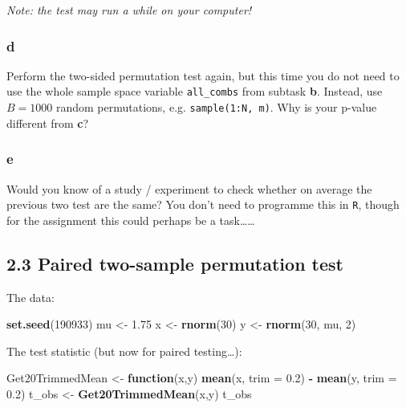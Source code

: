 \documentclass[]{article}
\newenvironment{Shaded}{\begin{snugshade}}{\end{snugshade}}
\newcommand{\ControlFlowTok}[1]{\textcolor[rgb]{0.13,0.29,0.53}{\textbf{#1}}}
\newcommand{\DataTypeTok}[1]{\textcolor[rgb]{0.13,0.29,0.53}{#1}}
\newcommand{\DecValTok}[1]{\textcolor[rgb]{0.00,0.00,0.81}{#1}}
\newcommand{\FloatTok}[1]{\textcolor[rgb]{0.00,0.00,0.81}{#1}}
\newcommand{\KeywordTok}[1]{\textcolor[rgb]{0.13,0.29,0.53}{\textbf{#1}}}
\newcommand{\NormalTok}[1]{#1}
\newcommand{\OperatorTok}[1]{\textcolor[rgb]{0.81,0.36,0.00}{\textbf{#1}}}
\newcommand{\StringTok}[1]{\textcolor[rgb]{0.31,0.60,0.02}{#1}}
\begin{document}
\emph{Note: the test may run a while on your computer!}

\hypertarget{d}{%
\subsubsection{d}\label{d}}

Perform the two-sided permutation test again, but this time you do not
need to use the whole sample space variable \texttt{all\_combs} from
subtask \textbf{b}. Instead, use \(B = 1000\) random permutations, e.g.
\texttt{sample(1:N,\ m)}. Why is your p-value different from \textbf{c}?

\hypertarget{e}{%
\subsubsection{e}\label{e}}

Would you know of a study / experiment to check whether on average the
previous two test are the same? You don't need to programme this in
\texttt{R}, though for the assignment this could perhaps be a
task\ldots{}\ldots{}

\hypertarget{paired-two-sample-permutation-test}{%
\subsection{2.3 Paired two-sample permutation
test}\label{paired-two-sample-permutation-test}}

The data:

\begin{Shaded}
\begin{Highlighting}[]
\KeywordTok{set.seed}\NormalTok{(}\DecValTok{190933}\NormalTok{)}
\NormalTok{mu <-}\StringTok{ }\FloatTok{1.75}
\NormalTok{x <-}\StringTok{ }\KeywordTok{rnorm}\NormalTok{(}\DecValTok{30}\NormalTok{)}
\NormalTok{y <-}\StringTok{ }\KeywordTok{rnorm}\NormalTok{(}\DecValTok{30}\NormalTok{, mu, }\DecValTok{2}\NormalTok{)}
\end{Highlighting}
\end{Shaded}

The test statistic (but now for paired testing\ldots{}):

\begin{Shaded}
\begin{Highlighting}[]
\NormalTok{Get20TrimmedMean <-}\StringTok{ }\ControlFlowTok{function}\NormalTok{(x,y) }\KeywordTok{mean}\NormalTok{(x, }\DataTypeTok{trim =} \FloatTok{0.2}\NormalTok{) }\OperatorTok{-}\StringTok{ }\KeywordTok{mean}\NormalTok{(y, }\DataTypeTok{trim =} \FloatTok{0.2}\NormalTok{) }
\NormalTok{t_obs <-}\StringTok{ }\KeywordTok{Get20TrimmedMean}\NormalTok{(x,y)}
\NormalTok{t_obs}
\end{Highlighting}
\end{Shaded}
\end{document}
